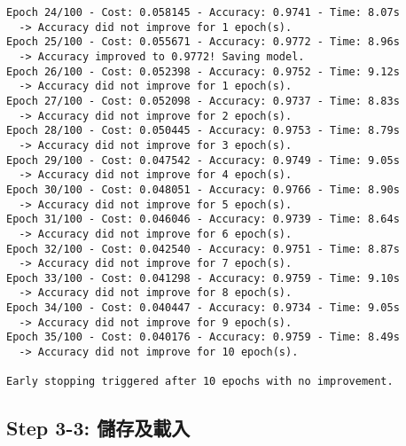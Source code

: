 \documentclass[11pt]{article}
\begin{document}
\begin{Verbatim}[commandchars=\\\{\}]
Epoch 24/100 - Cost: 0.058145 - Accuracy: 0.9741 - Time: 8.07s
  -> Accuracy did not improve for 1 epoch(s).
Epoch 25/100 - Cost: 0.055671 - Accuracy: 0.9772 - Time: 8.96s
  -> Accuracy improved to 0.9772! Saving model.
Epoch 26/100 - Cost: 0.052398 - Accuracy: 0.9752 - Time: 9.12s
  -> Accuracy did not improve for 1 epoch(s).
Epoch 27/100 - Cost: 0.052098 - Accuracy: 0.9737 - Time: 8.83s
  -> Accuracy did not improve for 2 epoch(s).
Epoch 28/100 - Cost: 0.050445 - Accuracy: 0.9753 - Time: 8.79s
  -> Accuracy did not improve for 3 epoch(s).
Epoch 29/100 - Cost: 0.047542 - Accuracy: 0.9749 - Time: 9.05s
  -> Accuracy did not improve for 4 epoch(s).
Epoch 30/100 - Cost: 0.048051 - Accuracy: 0.9766 - Time: 8.90s
  -> Accuracy did not improve for 5 epoch(s).
Epoch 31/100 - Cost: 0.046046 - Accuracy: 0.9739 - Time: 8.64s
  -> Accuracy did not improve for 6 epoch(s).
Epoch 32/100 - Cost: 0.042540 - Accuracy: 0.9751 - Time: 8.87s
  -> Accuracy did not improve for 7 epoch(s).
Epoch 33/100 - Cost: 0.041298 - Accuracy: 0.9759 - Time: 9.10s
  -> Accuracy did not improve for 8 epoch(s).
Epoch 34/100 - Cost: 0.040447 - Accuracy: 0.9734 - Time: 9.05s
  -> Accuracy did not improve for 9 epoch(s).
Epoch 35/100 - Cost: 0.040176 - Accuracy: 0.9759 - Time: 8.49s
  -> Accuracy did not improve for 10 epoch(s).

Early stopping triggered after 10 epochs with no improvement.
    \end{Verbatim}

    \subsection{Step 3-3:
儲存及載入}\label{step-3-3-ux5132ux5b58ux53caux8f09ux5165}
\end{document}
